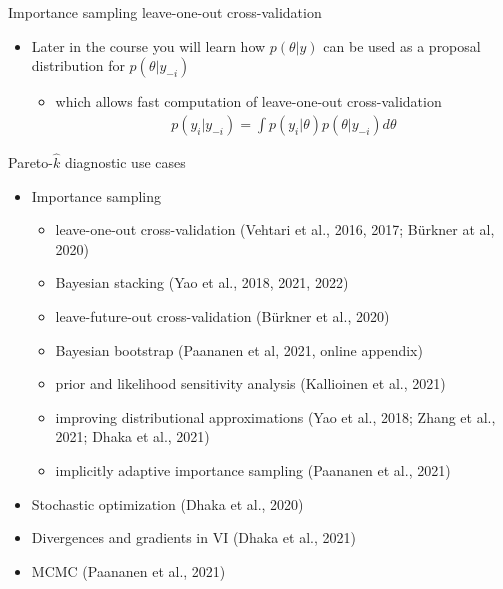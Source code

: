 \documentclass[english,t]{beamer}
\begin{document}
\begin{frame}{Importance sampling leave-one-out cross-validation}

  \begin{itemize}
  \item Later in the course you will learn how $p(\theta|y)$ can be
    used as a proposal distribution for $p(\theta|y_{-i})$
    \begin{itemize}
    \item which allows fast computation of leave-one-out cross-validation
      \begin{align*}
        p(y_i|y_{-i})=\int p(y_i|\theta) p(\theta|y_{-i}) d\theta
      \end{align*}
    \end{itemize}
  \end{itemize}

\end{frame}

\begin{frame}{Pareto-$\hat{k}$ diagnostic use cases}

  \vspace{-.5\baselineskip}
  \begin{itemize}
  \item Importance sampling
    \begin{itemize}
    \item leave-one-out cross-validation (Vehtari et al., 2016, 2017; Bürkner at al, 2020)
    \item Bayesian stacking (Yao et al., 2018, 2021, 2022)
    \item leave-future-out cross-validation (Bürkner et al., 2020)
    \item Bayesian bootstrap (Paananen et al, 2021, online appendix)
    \item prior and likelihood sensitivity analysis (Kallioinen et al., 2021)
    \item improving distributional approximations (Yao et al., 2018; Zhang et al., 2021; Dhaka et al., 2021)
    \item implicitly adaptive importance sampling (Paananen et al., 2021)
    \end{itemize}
  \item Stochastic optimization (Dhaka et al., 2020)
  \item Divergences and gradients in VI (Dhaka et al., 2021)
  \item MCMC (Paananen et al., 2021)
  \end{itemize}

\end{frame}
\end{document}
